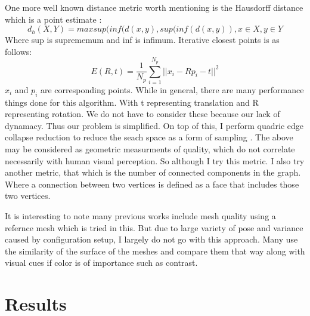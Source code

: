 One more well known distance metric worth mentioning is the Hausdorff distance which is a point estimate \cite{huttenlocher1993comparing}:
\begin{equation}
	d_h(X, Y) = max{sup(inf(d(x, y),sup(inf(d(x,y))}, x\in X, y\in Y
\end{equation}
Where sup is suprememum and inf is infimum.
Iterative closest points is as follows:
\begin{equation}
	E(R, t) = \frac{1}{N_p}\sum_{i=1}^{N_p}||x_i - Rp_i - t||^2
\end{equation}
$x_i$ and $p_i$ are corresponding points.
While in general, there are many performance things done for this algorithm. With t representing translation and R representing rotation. We do not have to consider these because our lack of dynamacy. Thus our problem is simplified. On top of this, I perform quadric edge collapse reduction to reduce the seach space as a form of sampling \cite{hussain2004efficient}.
The above may be considered as geometric measurments of quality, which do not correlate necessarily with human visual perception. So although I try this metric. I also try another metric, that which is the number of connected components in the graph. Where a connection between two vertices is defined as a face that includes those two vertices.

It is interesting to note many previous works include mesh quality using a refernce mesh which is tried in this. But due to large variety of pose and variance caused by configuration setup, I largely do not go with this approach. Many use the similarity of the surface of the meshes and compare them that way along with visual cues if color is of importance such as contrast.
\chapter{Results}
